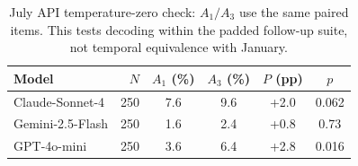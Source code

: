 \begin{table}[htbp]
\caption{July API temperature-zero check: $A_1/A_3$ use the same paired items. This tests decoding within the padded follow-up suite, not temporal equivalence with January.}
\label{tab:api_t0}
\centering
\small
\setlength{\tabcolsep}{3.5pt}
\begin{tabular}{lrcccc}
\toprule
Model & $N$ & $A_1$ (\%) & $A_3$ (\%) & $P$ (pp) & $p$ \\
\midrule
Claude-Sonnet-4 & 250 & 7.6 & 9.6 & +2.0 & 0.062 \\
Gemini-2.5-Flash & 250 & 1.6 & 2.4 & +0.8 & 0.73 \\
GPT-4o-mini & 250 & 3.6 & 6.4 & +2.8 & 0.016 \\
\bottomrule
\end{tabular}
\end{table}
